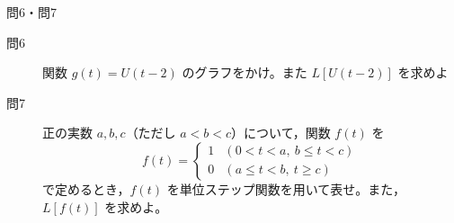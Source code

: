 \begin{frame}{問6・問7}
  \begin{description}
    \item[問6] 関数 $g(t) = U(t-2)$ のグラフをかけ。また $L[U(t-2)]$ を求めよ
    \item[問7] 正の実数 $a, b, c$（ただし $a < b < c$）について，関数 $f(t)$ を
    \[
    f(t) = \begin{cases} 1 & (0 < t < a,\ b \leq t < c) \\ 0 & (a \leq t < b,\ t \geq c) \end{cases}
    \]
    で定めるとき，$f(t)$ を単位ステップ関数を用いて表せ。また，$L[f(t)]$ を求めよ。
  \end{description}
\end{frame}

